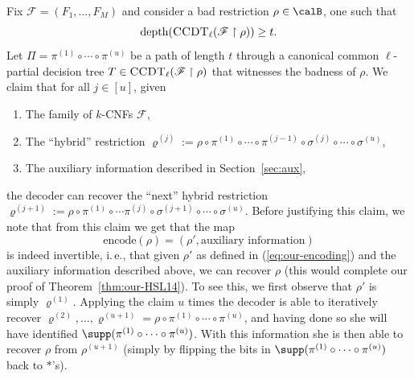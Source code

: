 \documentclass[11pt]{article}
\numberwithin{equation}{section}
\theoremstyle{definition}
\theoremstyle{plain}
\newcommand{\ie}{i.\,e.}
\theoremstyle{plain}
\newcommand{\uhr}{\upharpoonright}
\newcommand{\encode}{\mathrm{encode}}
\newcommand{\CCDT}{\textsc{CCDT}}
\newcommand{\depth}{\mathrm{depth}}
\begin{document}
Fix $\mathscr{F} = (F_1,\ldots,F_M)$ and consider a bad restriction $\rho \in\calB$, one such that 
\[ \depth(\CCDT_{\ell}(\mathscr{F}\uhr\rho)) \ge t. \] 
Let $\Pi = \pi^{(1)} \circ \cdots \circ \pi^{(u)}$ be a path of length $t$ through a canonical common $\ell$-partial decision tree $T \in \CCDT_\ell(\mathscr{F} \uhr \rho)$ that witnesses the badness of $\rho$.  We claim that for all $j\in [u]$, given 
\begin{enumerate}
\item The family of $k$-CNFs $\mathscr{F}$, 
\item The ``hybrid'' restriction $\varrho^{(j)} := \rho \circ \pi^{(1)}\circ\cdots\circ \pi^{(j-1)} \circ \sigma^{(j)} \circ\cdots \circ \sigma^{(u)}$, 
\item The auxiliary information described in Section~\ref{sec:aux}, 
\end{enumerate} 
the decoder can recover the ``next'' hybrid restriction $\varrho^{(j+1)} := \rho\circ \pi^{(1)} \circ \cdots \pi^{(j)} \circ \sigma^{(j+1)}\circ \cdots \circ \sigma^{(u)}$.  Before justifying this claim, we note that from this claim we get that the map
\begin{equation}   %
  \encode(\rho) = (\rho',\text{auxiliary information})
\end{equation}
is indeed invertible, \ie, that given $\rho'$ as defined in (\ref{eq:our-encoding}) and the auxiliary information described above, we can recover $\rho$ (this would complete our proof of Theorem~\ref{thm:our-HSL14}). To see this, we first observe that $\rho'$ is simply $\varrho^{(1)}$. Applying the claim $u$ times the decoder is able to iteratively recover $\varrho^{(2)},\ldots,\varrho^{(u+1)} = \rho\circ\pi^{(1)}\circ\cdots\circ \pi^{(u)}$, and having done so she will have identified $\supp(\pi^{(1)}\circ\cdots\circ \pi^{(u)})$. With this information she is then able to recover $\rho$ from $\rho^{(u+1)}$ (simply by flipping the bits in $\supp(\pi^{(1)}\circ\cdots\circ \pi^{(u)})$ back to $\ast$'s).
\end{document}
